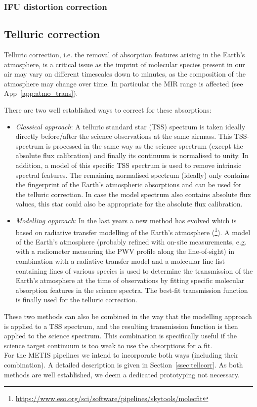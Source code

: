 \subsubsection{IFU distortion correction}\label{ssec:criticalwavelengthanddistortionifu}


\subsection{Telluric correction}\label{ssec:criticaltelluriccorrection}
Telluric correction, i.e. the removal of absorption features arising in the Earth's atmosphere,
is a critical issue as the imprint of molecular species present in our air may vary on different timescales
down to minutes, as the composition of the atmosphere may change over time.
In particular the \ac{MIR} range is affected (see App~\ref{app:atmo_trans}).

There are two well established ways to correct for these absorptions:
\begin{itemize}
    \item \textit{Classical approach}: A telluric standard star (\ac{TSS}) spectrum is taken ideally directly before/after the science observations at the same airmass. This \ac{TSS}-spectrum is processed in the same way as the science spectrum (except the absolute flux calibration) and finally its continuum is normalised to unity. In addition, a model of this specific \ac{TSS} spectrum is used to remove intrinsic spectral features. The remaining normalised spectrum (ideally) only contains the fingerprint of the Earth's atmospheric absorptions and can be used for the telluric correction. In case the model spectrum also contains absolute flux values, this star could also be appropriate for the absolute flux calibration.
    \item \textit{Modelling approach}: In the last years a new method has evolved which is based on radiative transfer modelling of the Earth's atmosphere (\cite{mf1, mf2, molecfit}\footnote{\url{https://www.eso.org/sci/software/pipelines/skytools/molecfit}}). A model of the Earth's atmosphere (probably refined with on-site measurements, e.g. with a radiometer measuring the \ac{PWV} profile along the line-of-sight) in combination with a radiative transfer model and a molecular line list containing lines of various species is used to determine the transmission of the Earth's atmosphere at the time of observations by fitting specific molecular absorption features in the science spectra. The best-fit transmission function is finally used for the telluric correction.
\end{itemize}
These two methods can also be combined in the way that the modelling approach is applied to a \ac{TSS} spectrum, and the resulting transmission function is then applied to the science spectrum. This combination is specifically useful if the science target continuum is too weak to use the absorptions for a fit.\\
For the \ac{METIS} pipelines we intend to incorporate both ways (including their combination). A detailed description is given in Section~\ref{ssec:tellcorr}. As both methods are well established, we deem a dedicated prototyping not necessary.

